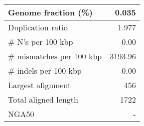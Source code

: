 \documentclass[12pt,a4paper]{article}
\begin{document}
\begin{table}[ht]
\begin{center}
\begin{tabular}{|l*{1}{|r}|}
Genome fraction (\%) & 0.035 \\ \hline
Duplication ratio & 1.977 \\ \hline
\# N's per 100 kbp & 0.00 \\ \hline
\# mismatches per 100 kbp & 3193.96 \\ \hline
\# indels per 100 kbp & 0.00 \\ \hline
Largest alignment & 456 \\ \hline
Total aligned length & 1722 \\ \hline
NGA50 & - \\ \hline
\end{tabular}
\end{center}
\end{table}
\end{document}
